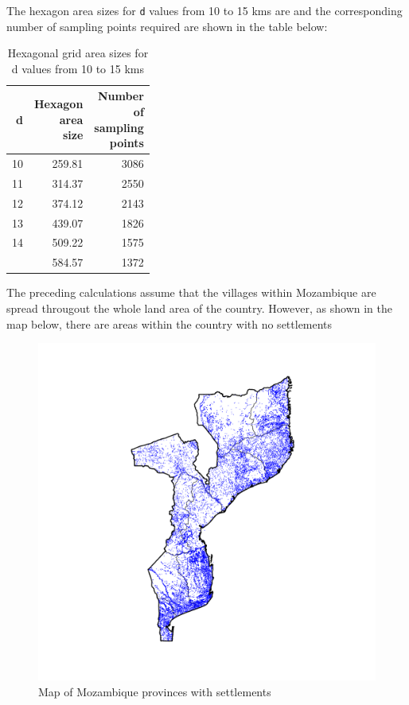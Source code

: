 \documentclass[
  12pt,
  a4paper]{article}
\begin{document}
The hexagon area sizes for \texttt{d} values from 10 to 15 kms are and the corresponding number of sampling points required are shown in the table below:

\begin{table}[H]

\caption{\label{tab:calc}Hexagonal grid area sizes for d values from 10 to 15 kms}
\centering
\begin{tabular}[t]{rrr}
\toprule
d & \makecell[c]{Hexagon\\area\\size} & \makecell[c]{Number\\of\\sampling\\points}\\
\midrule
\rowcolor{gray!6}  10 & 259.81 & 3086\\
11 & 314.37 & 2550\\
\rowcolor{gray!6}  12 & 374.12 & 2143\\
13 & 439.07 & 1826\\
\rowcolor{gray!6}  14 & 509.22 & 1575\\
\addlinespace
15 & 584.57 & 1372\\
\bottomrule
\end{tabular}
\end{table}

The preceding calculations assume that the villages within Mozambique are spread througout the whole land area of the country. However, as shown in the map below, there are areas within the country with no settlements

\begin{figure}[H]

{\centering \includegraphics{mozambiqueNotes_files/figure-latex/settlementsPlot-1} 

}

\caption{Map of Mozambique provinces with settlements}\label{fig:settlementsPlot}
\end{figure}
\end{document}
